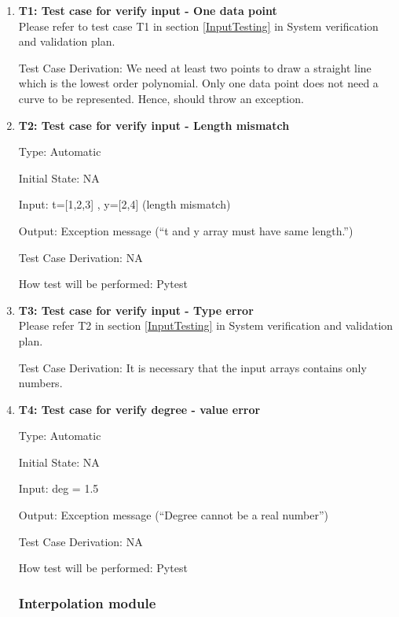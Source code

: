 \documentclass[12pt, titlepage]{article}
\begin{document}
\begin{enumerate}

\item{\textbf{T1: Test case for verify input - One data point}}\\
Please refer to test case T1 in section \ref{InputTesting} in System 
verification and validation plan.
				
Test Case Derivation: We need at least two points to draw a straight line which 
is the lowest order polynomial. Only one data point does not need a curve to be 
represented. Hence, \famname{} should throw an exception.
					
\item{\textbf{T2: Test case for verify input - Length mismatch}}

Type: Automatic
					
Initial State: NA 
					
Input: t=[1,2,3] , y=[2,4] (length mismatch)
					
Output: Exception message (``t and y array must have same length.'')

Test Case Derivation: NA

How test will be performed: Pytest


\item{\textbf{T3: Test case for verify input - Type error}}\\
Please refer T2 in section \ref{InputTesting} in System verification and 
validation plan.
					

Test Case Derivation: It is necessary that the input arrays contains only 
numbers.



\item{\textbf{T4: Test case for verify degree - value error}}

Type: Automatic

Initial State: NA 

Input: deg = 1.5 

Output: Exception message (``Degree cannot be a real number'')

Test Case Derivation: NA

How test will be performed: Pytest


    
\subsubsection{Interpolation module}


\end{enumerate}
\end{document}
